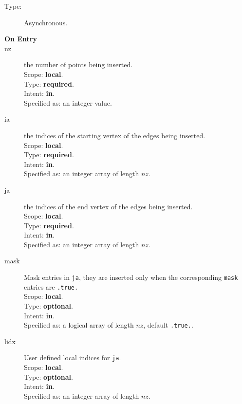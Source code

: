 \begin{description}
\item[Type:] Asynchronous.
\item[\bf On Entry]
\item[nz] the number of points being inserted.\\
Scope: {\bf local}.\\
Type: {\bf required}.\\
Intent: {\bf in}.\\
Specified as: an integer value.
\item[ia] the indices of the starting vertex of the edges  being inserted.\\
Scope: {\bf local}.\\
Type: {\bf required}.\\
Intent: {\bf in}.\\
Specified as: an integer array of length $nz$.
\item[ja]  the indices of the end vertex of the edges  being inserted.\\
Scope: {\bf local}.\\
Type: {\bf required}.\\
Intent: {\bf in}.\\
Specified as: an integer array of length $nz$.
\item[mask] Mask entries in \verb|ja|, they are inserted only when the
  corresponding \verb|mask| entries are \verb|.true.|\\
Scope: {\bf local}.\\
Type: {\bf optional}.\\
Intent: {\bf in}.\\
Specified as: a logical  array of length $nz$, default \verb|.true.|.
\item[lidx]  User defined local indices for \verb|ja|.\\
Scope: {\bf local}.\\
Type: {\bf optional}.\\
Intent: {\bf in}.\\
Specified as: an integer array of length $nz$.
\end{description}

